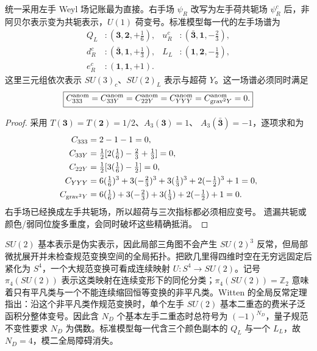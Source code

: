 \begin{proposition}[一代标准模型的局域规范反常抵消]
统一采用左手 Weyl 场记账最为直接。右手场 $\psi_R$ 改写为左手荷共轭场 $\psi_R^c$ 后，非阿贝尔表示变为共轭表示，$U(1)$ 荷变号。标准模型每一代的左手场谱为
\begin{align}
 Q_L&:(\mathbf3,\mathbf2,+\tfrac16),&
 u_R^c&:(\bar{\mathbf3},\mathbf1,-\tfrac23),\\
 d_R^c&:(\bar{\mathbf3},\mathbf1,+\tfrac13),&
 L_L&:(\mathbf1,\mathbf2,-\tfrac12),\\
 e_R^c&:(\mathbf1,\mathbf1,+1).
 \label{eq:sm-left-weyl-anomaly-set-dp11}
\end{align}
这里三元组依次表示 $SU(3)_c$、$SU(2)_L$ 表示与超荷 $Y$。这一场谱必须同时满足
\begin{equation}
 \boxed{
 C_{333}^{\rm anom}=
 C_{33Y}^{\rm anom}=
 C_{22Y}^{\rm anom}=
 C_{YYY}^{\rm anom}=
 C_{{\rm grav}^2Y}^{\rm anom}=0.}
 \label{eq:sm-gauge-anomaly-cancellation-dp32}
\end{equation}
\end{proposition}

\begin{proof}
采用 $T(\mathbf3)=T(\mathbf2)=1/2$、$A_3(\mathbf3)=1$、
$A_3(\bar{\mathbf3})=-1$，逐项求和为
\begin{align*}
C_{333}&=2-1-1=0,\\
C_{33Y}&=\tfrac12[2(\tfrac16)-\tfrac23+\tfrac13]=0,\\
C_{22Y}&=\tfrac12[3(\tfrac16)-\tfrac12]=0,\\
C_{YYY}&=6(\tfrac16)^3+3(-\tfrac23)^3+3(\tfrac13)^3
+2(-\tfrac12)^3+1=0,\\
C_{{\rm grav}^2Y}&=6(\tfrac16)+3(-\tfrac23)+3(\tfrac13)
+2(-\tfrac12)+1=0.
\end{align*}
右手场已经换成左手共轭场，所以超荷与三次指标都必须相应变号。
遗漏共轭或颜色/弱同位旋多重度，会同时破坏这些精确抵消。
\end{proof}

\begin{theorem}
$SU(2)$ 基本表示是伪实表示，因此局部三角图不会产生 $SU(2)^3$ 反常，但局部微扰展开并未检查规范变换空间的全局拓扑。把欧几里得四维时空在无穷远固定后紧化为 $S^4$，一个大规范变换可看成连续映射 $U:S^4\to SU(2)$。记号 $\pi_4(SU(2))$ 表示这类映射在连续变形下的同伦分类；$\pi_4(SU(2))=\mathbb Z_2$ 意味着只有平凡类与一个不能连续缩回恒等变换的非平凡类。Witten 的全局反常定理指出：沿这个非平凡类作规范变换时，单个左手 $SU(2)$ 基本二重态的费米子泛函积分整体变号。因此含 $N_D$ 个基本左手二重态时总符号为 $(-1)^{N_D}$，量子规范不变性要求 $N_D$ 为偶数。标准模型每一代含三个颜色副本的 $Q_L$ 与一个 $L_L$，故 $N_D=4$，模二全局障碍消失。

\end{theorem}

